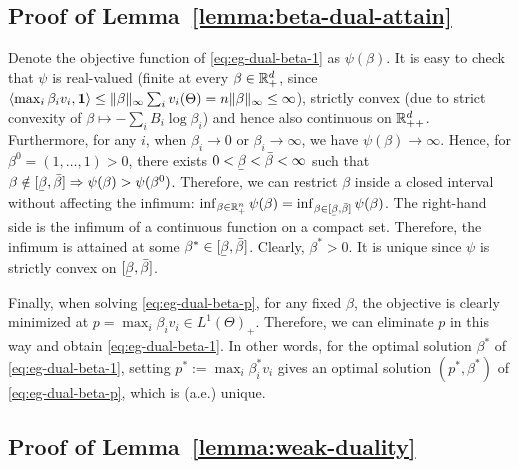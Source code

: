 	\subsection*{Proof of Lemma~\ref{lemma:beta-dual-attain}}
	Denote the objective function of \eqref{eq:eg-dual-beta-1} as $\psi(\beta)$. It is easy to check that $\psi$ is real-valued (finite at every $\beta\in \mathbb{R}^d_+$, since $\langle \max_i \beta_i v_i, \mathbf{1} \rangle \leq \|\beta\|_\infty \sum_i v_i(\Theta) = n \|\beta\|_\infty \leq \infty $), strictly convex (due to strict convexity of $\beta\mapsto -\sum_i B_i \log \beta_i$) and hence also continuous on $\mathbb{R}^d_{++}$.
	Furthermore, for any $i$, when $\beta_i\rightarrow 0$ or $\beta_i \rightarrow \infty$, we have $\psi(\beta) \rightarrow \infty$.
	Hence, for $\beta^0 = (1, \dots, 1)>0$, there exists $0 < \ubar{\beta} < \bar{\beta} < \infty$ such that 
	$\beta\notin [\ubar{\beta}, \bar{\beta}] \Rightarrow \psi(\beta) > \psi(\beta^0)$.
	Therefore, we can restrict $\beta$ inside a closed interval without affecting the infimum:
	$ \inf_{\beta\in \RR_+^n } \psi(\beta) = \inf_{\beta\in [\ubar{\beta}, \bar{\beta}] }\psi(\beta)$. 
	The right-hand side is the infimum of a continuous function on a compact set. Therefore, the infimum is attained at some $\beta^* \in [\ubar{\beta}, \bar{\beta}]$. Clearly, $\beta^* > 0$. It is unique since $\psi$ is strictly convex on $[\ubar{\beta}, \bar{\beta}]$.
	
	Finally, when solving \eqref{eq:eg-dual-beta-p}, for any fixed $\beta$, the objective is clearly minimized at $p = \max_i \beta_i v_i \in L^1(\Theta)_+$. Therefore, we can eliminate $p$ in this way and obtain \eqref{eq:eg-dual-beta-1}. In other words, for the optimal solution $\beta^*$ of \eqref{eq:eg-dual-beta-1}, setting $p^* := \max_i \beta^*_i v_i$ gives an optimal solution $(p^*, \beta^*)$ of \eqref{eq:eg-dual-beta-p}, which is (a.e.) unique. 

	\subsection*{Proof of Lemma~\ref{lemma:weak-duality}}
